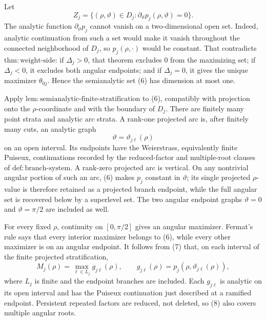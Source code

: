 Let
\[
Z_j=\{(\rho,\vartheta)\in D_j:
             \partial_{\vartheta}p_j(\rho,\vartheta)=0\}.         \tag{6}
\]
The analytic function \(\partial_{\vartheta}p_j\) cannot vanish on a two-dimensional open set.  Indeed, analytic continuation from such a set would make it vanish throughout the connected neighborhood of \(D_j\), so \(p_j(\rho,\cdot)\) would be constant.  That contradicts \(\mathrm{thm{:}weight\mbox{-}side}\): if \(\Delta_j>0\), that theorem excludes \(0\) from the maximizing set; if \(\Delta_j<0\), it excludes both angular endpoints; and if \(\Delta_j=0\), it gives the unique maximizer \(\theta_{0j}\).  Hence the semianalytic set (6) has dimension at most one.

Apply \(\mathrm{lem{:}semianalytic\mbox{-}finite\mbox{-}stratification}\) to (6), compatibly with projection onto the \(\rho\)-coordinate and with the boundary of \(D_j\).  There are finitely many point strata and analytic arc strata.  A rank-one projected arc is, after finitely many cuts, an analytic graph
\[
\vartheta=\vartheta_{j\ell}(\rho)                                  \tag{7}
\]
on an open interval.  Its endpoints have the Weierstrass, equivalently finite Puiseux, continuations recorded by the reduced-factor and multiple-root clauses of \(\mathrm{def{:}branch\mbox{-}system}\).  A rank-zero projected arc is vertical.  On any nontrivial angular portion of such an arc, (6) makes \(p_j\) constant in \(\vartheta\); its single projected \(\rho\)-value is therefore retained as a projected branch endpoint, while the full angular set is recovered below by a superlevel set.  The two angular endpoint graphs \(\vartheta=0\) and \(\vartheta=\pi/2\) are included as well.

For every fixed \(\rho\), continuity on \([0,\pi/2]\) gives an angular maximizer.  Fermat's rule says that every interior maximizer belongs to (6), while every other maximizer is on an angular endpoint.  It follows from (7) that, on each interval of the finite projected stratification,
\[
M_j(\rho)=\max_{\ell\in L_j}g_{j\ell}(\rho),
\qquad
g_{j\ell}(\rho)
=p_j\!\left(\rho,\vartheta_{j\ell}(\rho)\right),                 \tag{8}
\]
where \(L_j\) is finite and the endpoint branches are included.  Each \(g_{j\ell}\) is analytic on its open interval and has the Puiseux continuation just described at a ramified endpoint.  Persistent repeated factors are reduced, not deleted, so (8) also covers multiple angular roots.

